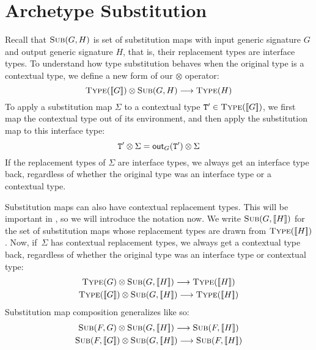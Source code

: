 \documentclass[../generics]{subfiles}
\begin{document}
\section{Archetype Substitution}\label{archetypesubst}

Recall that $\textsc{Sub}({G, H})$ is set of substitution maps with input generic signature $G$ and output generic signature $H$, that is, their replacement types are interface types. To understand how type substitution behaves when the original type is a contextual type, we define a new form of our $\otimes$ operator:
\[
\textsc{Type}({[\![G]\!]})\otimes\textsc{Sub}({G, H})\longrightarrow\textsc{Type}({H})
\]
To apply a substitution map $\Sigma$ to a contextual type $\texttt{T}^\prime\in\textsc{Type}({[\![G]\!]})$, we first map the contextual type out of its environment, and then apply the substitution map to this interface type:
\[\texttt{T}^\prime\otimes \Sigma = \mathsf{out}_G(\texttt{T}^\prime)\otimes \Sigma\]
If the replacement types of $\Sigma$ are interface types, we always get an interface type back, regardless of whether the original type was an interface type or a contextual type.

Substitution maps can also have contextual replacement types. This will be important in , so we will introduce the notation now. We write $\textsc{Sub}({G, [\![H]\!]})$ for the set of substitution maps whose replacement types are drawn from $\textsc{Type}({[\![H]\!]})$. Now, if~$\Sigma$ has contextual replacement types, we always get a contextual type back, regardless of whether the original type was an interface type or contextual type:
\begin{gather*}
\TypeObj{G}\otimes\SubMapObj{G}{\EquivClass{H}}\longrightarrow\TypeObj{\EquivClass{H}}\\
\TypeObj{\EquivClass{G}}\otimes\SubMapObj{G}{\EquivClass{H}}\longrightarrow\TypeObj{\EquivClass{H}}
\end{gather*}
Substitution map composition generalizes like so:
\begin{gather*}
\SubMapObj{F}{G}\otimes\SubMapObj{G}{\EquivClass{H}}\longrightarrow\SubMapObj{F}{\EquivClass{H}}\\
\SubMapObj{F}{\EquivClass{G}}\otimes\SubMapObj{G}{\EquivClass{H}}\longrightarrow\SubMapObj{F}{\EquivClass{H}}
\end{gather*}
\end{document}
